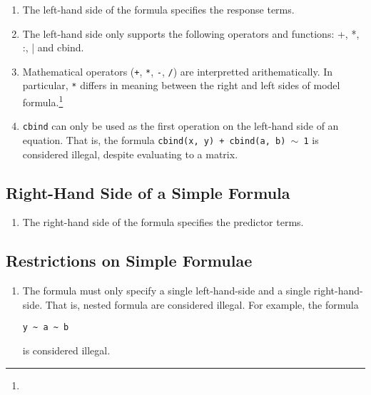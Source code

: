 \documentclass{article}
\newcommand{\tweedly}[0]{$\sim${ }}
\begin{document}
\begin{enumerate}

  \item The left-hand side of the formula specifies the response terms.

  \item The left-hand side only supports the following operators and functions:
    +, *, :, | and cbind.

  \item Mathematical operators (\verb|+|, \verb|*|, \verb|-|, \verb|/|) are
    interpretted arithematically. In particular, \verb|*| differs in meaning
    between the right and left sides of model formula.\footnote{}

  \item \verb|cbind| can only be used as the first operation on the left-hand side
    of an equation. That is, the formula
    {\tt cbind(x, y) + cbind(a, b) \tweedly 1} is considered illegal, despite
    evaluating to a matrix.

\end{enumerate}


\subsection{Right-Hand Side of a Simple Formula}
\label{subsec:rhs}

\begin{enumerate}

  \item The right-hand side of the formula specifies the predictor terms.

\end{enumerate}

\subsection{Restrictions on Simple Formulae}
\label{subsec:restriction-simple-formula}

\begin{enumerate}

  \item The formula must only specify a single left-hand-side and a single
    right-hand-side. That is, nested formula are considered illegal. For
    example, the formula \begin{verbatim}y ~ a ~ b\end{verbatim} is considered 
    illegal.

\end{enumerate}
\end{document}
